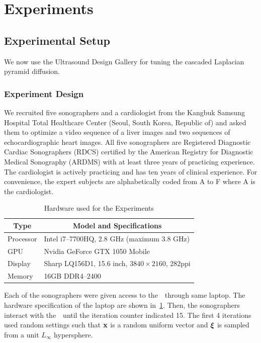 

%

\section{Experiments}\label{section:eval}

\subsection{Experimental Setup}
We now use the Ultrasound Design Gallery for tuning the cascaded Laplacian pyramid diffusion.

\subsubsection{Experiment Design}
We recruited five sonographers and a cardiologist from the Kangbuk Samsung Hospital Total Healthcare Center (Seoul, South Korea, Republic of) and asked them to optimize a video sequence of a liver images and two sequences of echocardiographic heart images.
All five sonographers are Registered Diagnostic Cardiac Sonographers (RDCS) certified by the American Registry for Diagnostic Medical Sonography (ARDMS) with at least three years of practicing experience.
The cardiologist is actively practicing and has ten years of clinical experience.
For convenience, the expert subjects are alphabetically coded from A to F where A is the cardiologist.

\begin{table}
  \centering
  \caption{Hardware used for the Experiments}\label{table:specs}
  \begin{threeparttable}
  \begin{tabular}{ll}
    \toprule
    \multicolumn{1}{c}{\textbf{Type}}
    & \multicolumn{1}{c}{\textbf{Model and Specifications}}
    \\ \midrule
    Processor & Intel i7--7700HQ, 2.8 GHz (maximum 3.8 GHz) \\
    GPU       & Nvidia GeForce GTX 1050 Mobile \\
    Display   & Sharp LQ156D1, 15.6 inch, \(3840 \times 2160\), 282ppi  \\
    Memory    & 16GB DDR4--2400 \\ \bottomrule
  \end{tabular}
  \end{threeparttable}
\end{table}
%
Each of the sonographers were given access to the~\usdg~through same laptop.
The hardware specification of the laptop are shown in~\cref{table:specs}.
Then, the sonographers interact with the~\usdg~until the iteration counter indicated 15.
The first 4 iterations used random settings such that \(\mathbf{x}\) is a random uniform vector and \(\bm{\xi}\) is sampled from a unit \(L_{\infty}\) hypersphere.

